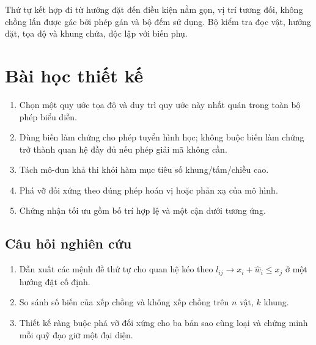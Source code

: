 Thứ tự kết hợp đi từ hướng đặt đến điều kiện nằm gọn, vị trí tương đối, không
chồng lấn được gác bởi phép gán và bộ đếm sử dụng. Bộ kiểm tra đọc vật, hướng
đặt, tọa độ và khung chứa, độc lập với biến phụ.

\section{Bài học thiết kế}

\begin{enumerate}
  \item Chọn một quy ước tọa độ và duy trì quy ước này nhất quán trong toàn bộ phép biểu diễn.
  \item Dùng biến làm chứng cho phép tuyển hình học; không buộc biến làm chứng trở thành
        quan hệ đầy đủ nếu phép giải mã không cần.
  \item Tách mô-đun khả thi khỏi hàm mục tiêu số khung/tấm/chiều cao.
  \item Phá vỡ đối xứng theo đúng phép hoán vị hoặc phản xạ của mô hình.
  \item Chứng nhận tối ưu gồm bố trí hợp lệ và một cận dưới tương ứng.
\end{enumerate}

\subsection*{Câu hỏi nghiên cứu}
\begin{enumerate}
  \item Dẫn xuất các mệnh đề thứ tự cho quan hệ kéo theo
        \(l_{ij}\rightarrow x_i+\widehat w_i\le x_j\) ở một hướng đặt cố định.
  \item So sánh số biến của xếp chồng và không xếp chồng trên \(n\) vật,
        \(k\) khung.
  \item Thiết kế ràng buộc phá vỡ đối xứng cho ba bản sao cùng loại và chứng minh
        mỗi quỹ đạo giữ một
        đại diện.
\end{enumerate}

